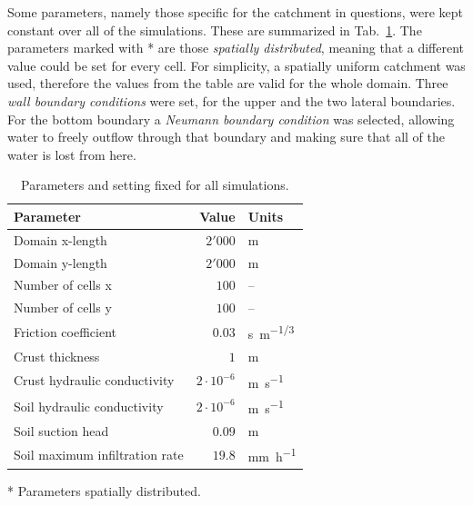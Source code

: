 {Some parameters, namely those specific for the catchment in questions, were kept constant over all of the simulations.
These are summarized in Tab.~\ref{tab:simulations_parameters}.
The parameters marked with * are those \emph{spatially distributed}, meaning that a different value could be set for every cell.
For simplicity, a spatially uniform catchment was used, therefore the values from the table are valid for the whole domain.
Three \textit{wall boundary conditions} were set, for the upper and the two lateral boundaries.
For the bottom boundary a \textit{Neumann boundary condition} was selected, allowing water to freely outflow through that boundary and making sure that all of the water is lost from here.

\begin{table}[h]
  \centering
  \caption{Parameters and setting fixed for all simulations.}
  \label{tab:simulations_parameters}
  \begin{threeparttable}
    \begin{tabular}{lrl}
      \toprule
      \textbf{Parameter} & \textbf{Value} & \textbf{Units} \\
      \midrule
      Domain x-length                          &    $2'000$           & \si{\meter}   \\
      Domain y-length                          &    $2'000$           & \si{\meter}   \\
      Number of cells x                        &    $100$             & --   \\
      Number of cells y                        &    $100$             & --   \\
      Friction coefficient\tnote{*}            &    $0.03$            & \si{s.m^{-1/3}}\\
      Crust thickness\tnote{*}                 &    $1$               & \si{\meter}\\
      Crust hydraulic conductivity\tnote{*}    &    $2\cdot 10^{-6}$  & \si{\meter\per\second}\\
      Soil hydraulic conductivity\tnote{*}     &    $2\cdot 10^{-6}$  & \si{\meter\per\second}\\
      Soil suction head\tnote{*}               &    $0.09$      & \si{\meter}\\
      Soil maximum infiltration rate\tnote{*}  &    $19.8$      & \si{\milli\meter\per\hour}\\
      \bottomrule
    \end{tabular}
    \begin{tablenotes}
      \item[*] Parameters spatially distributed.
    \end{tablenotes}
  \end{threeparttable}
\end{table}


}
